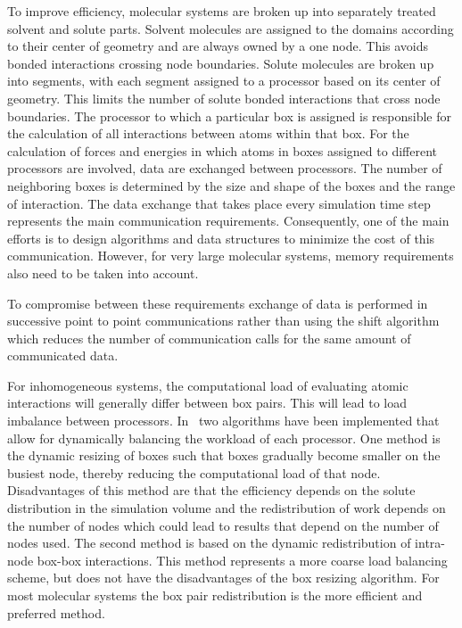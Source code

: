 To improve efficiency, molecular systems are broken up into separately
treated solvent and solute parts.
Solvent molecules are assigned to the domains according to their
center of geometry and are always owned by a one node. This avoids 
bonded interactions crossing node boundaries. 
Solute molecules are broken up into segments, with each 
segment assigned to a processor based on its center of geometry. 
This limits the number of solute bonded interactions that cross node 
boundaries.
The processor to which a particular box is assigned is responsible for
the calculation of all interactions between atoms within that box.
For the calculation of forces and energies in which atoms in
boxes assigned to different processors are involved, data are
exchanged between processors. The number of neighboring boxes is 
determined by the size and shape of the boxes and the range of 
interaction. The data exchange that takes place every simulation time 
step represents the main communication requirements.
Consequently, one of the main efforts is to design algorithms and
data structures to minimize the cost of this communication. However, 
for very large molecular systems, memory requirements also need to be 
taken into account. 

To compromise between these requirements exchange of data is performed
in successive point to point communications rather than using the
shift algorithm which reduces the number of communication calls
for the same amount of communicated data.

For inhomogeneous systems, the computational load of evaluating 
atomic interactions will generally differ between box pairs. 
This will lead to load imbalance between processors. In \nwargos\ 
two algorithms have been implemented that allow for dynamically 
balancing the workload of each processor.
One method is the dynamic resizing of boxes such that boxes gradually
become smaller on the busiest node, thereby reducing the computational
load of that node. Disadvantages of this method are that the 
efficiency depends on the solute distribution in the simulation volume
and the redistribution of work depends on the number of nodes which
could lead to results that depend on the number of nodes used.
The second method is based on the dynamic redistribution of intra-node
box-box interactions. This method represents a more coarse load
balancing scheme, but does not have the disadvantages of the box
resizing algorithm. For most molecular systems the box pair
redistribution is the more efficient and preferred  method.

